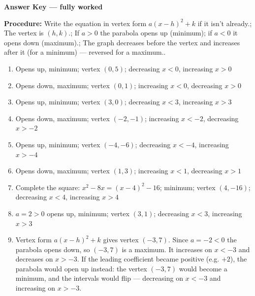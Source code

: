 \documentclass[12pt]{article}
\begin{document}
\begin{center}{\Large \textbf{Answer Key --- fully worked}}\end{center}
\vspace{0.25cm}
\textbf{Procedure:} Write the equation in vertex form $a(x-h)^2+k$ if it isn't already.; The vertex is $(h,k)$.; If $a>0$ the parabola opens up (minimum); if $a<0$ it opens down (maximum).; The graph decreases before the vertex and increases after it (for a minimum) --- reversed for a maximum..\\[8pt]
\begin{enumerate}[label=\textbf{\arabic*.},itemsep=7pt]
  \item Opens up, minimum; vertex $(0,5)$; decreasing $x<0$, increasing $x>0$
  \item Opens down, maximum; vertex $(0,1)$; increasing $x<0$, decreasing $x>0$
  \item Opens up, minimum; vertex $(3,0)$; decreasing $x<3$, increasing $x>3$
  \item Opens down, maximum; vertex $(-2,-1)$; increasing $x<-2$, decreasing $x>-2$
  \item Opens up, minimum; vertex $(-4,-6)$; decreasing $x<-4$, increasing $x>-4$
  \item Opens down, maximum; vertex $(1,3)$; increasing $x<1$, decreasing $x>1$
  \item Complete the square: $x^2-8x=(x-4)^2-16$; minimum; vertex $(4,-16)$; decreasing $x<4$, increasing $x>4$
  \item $a=2>0$ opens up, minimum; vertex $(3,1)$; decreasing $x<3$, increasing $x>3$
  \item Vertex form $a(x-h)^2+k$ gives vertex $(-3,7)$. Since $a=-2<0$ the parabola opens down, so $(-3,7)$ is a maximum. It increases on $x<-3$ and decreases on $x>-3$. If the leading coefficient became positive (e.g. $+2$), the parabola would open up instead: the vertex $(-3,7)$ would become a minimum, and the intervals would flip --- decreasing on $x<-3$ and increasing on $x>-3$.
\end{enumerate}
\end{document}
